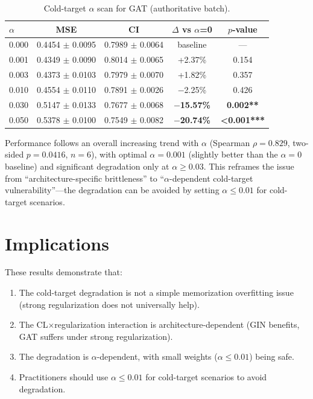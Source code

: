 \documentclass[10pt,a4paper]{article}
\begin{document}
\begin{table}[!h]
\caption{Cold-target $\alpha$ scan for GAT (authoritative batch).}
\label{tab:t11_results}
\centering
\begin{tabular}{lcccc}
\hline
$\alpha$ & \textbf{MSE} & \textbf{CI} & \textbf{$\Delta$ vs $\alpha$=0} & \textbf{$p$-value} \\
\hline
0.000 & 0.4454 $\pm$ 0.0095 & 0.7989 $\pm$ 0.0064 & baseline & --- \\
0.001 & 0.4349 $\pm$ 0.0090 & 0.8014 $\pm$ 0.0065 & +2.37\% & 0.154 \\
0.003 & 0.4373 $\pm$ 0.0103 & 0.7979 $\pm$ 0.0070 & +1.82\% & 0.357 \\
0.010 & 0.4554 $\pm$ 0.0110 & 0.7891 $\pm$ 0.0026 & $-$2.25\% & 0.426 \\
0.030 & 0.5147 $\pm$ 0.0133 & 0.7677 $\pm$ 0.0068 & \textbf{$-$15.57\%} & \textbf{0.002**} \\
0.050 & 0.5378 $\pm$ 0.0100 & 0.7549 $\pm$ 0.0082 & \textbf{$-$20.74\%} & \textbf{<0.001***} \\
\hline
\end{tabular}
\end{table}

Performance follows an overall increasing trend with $\alpha$ (Spearman $\rho=0.829$, two-sided $p=0.0416$, $n=6$), with optimal $\alpha=0.001$ (slightly better than the $\alpha=0$ baseline) and significant degradation only at $\alpha \geq 0.03$. This reframes the issue from ``architecture-specific brittleness'' to ``$\alpha$-dependent cold-target vulnerability''---the degradation can be avoided by setting $\alpha \leq 0.01$ for cold-target scenarios.

\section{Implications}

These results demonstrate that:
\begin{enumerate}
\item The cold-target degradation is not a simple memorization overfitting issue (strong regularization does not universally help).
\item The CL$\times$regularization interaction is architecture-dependent (GIN benefits, GAT suffers under strong regularization).
\item The degradation is $\alpha$-dependent, with small weights ($\alpha \leq 0.01$) being safe.
\item Practitioners should use $\alpha \leq 0.01$ for cold-target scenarios to avoid degradation.
\end{enumerate}
\end{document}
